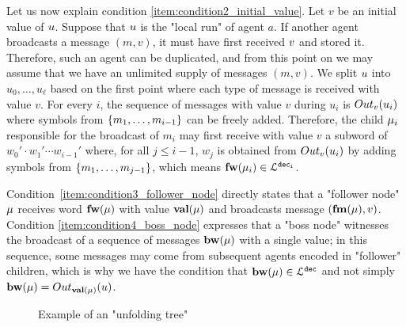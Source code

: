 Let us now explain condition \ref{item:condition2_initial_value}. Let $v$ be an initial value of $u$. Suppose that $u$ is the "local run" of agent $a$. If another agent broadcasts a message $(m,v)$, it must have first received $v$ and stored it. Therefore, such an agent can be duplicated, and from this point on we may assume that we have an unlimited supply of messages $(m,v)$.
We split $u$ into $u_0,\dots,u_\ell$ based on the first point where each type of message is received with value $v$. For every $i$, the sequence of messages with value $v$ during $u_i$ is $\voutput{v}{u_i}$ where symbols from $\{m_1,\dots, m_{i-1}\}$ can be freely added. Therefore, the child $\mu_i$ responsible for the broadcast of $m_i$ may first receive with value $v$ a subword of $w_0' \cdot w_1' \cdots w_{i-1}'$ where, for all $j \leq i-1$, $w_j$ is obtained from $\voutput{v}{u_i}$ by adding symbols from $\{m_1, \dots, m_{j-1}\}$, which means $\mathbf{fw}(\mu_i) \in \mathcal{L}^{\mathtt{\mathtt{dec}_i}}$.   

Condition~\ref{item:condition3_follower_node} directly states that a "follower node" $\mu$ receives word $\mathbf{fw}(\mu)$ with value $\mathbf{val}(\mu)$ and broadcasts message $(\mathbf{fm}(\mu), v)$. Condition \ref{item:condition4_boss_node} expresses that a "boss node" witnesses the broadcast of a sequence of messages $\mathbf{bw}(\mu)$ with a single value; in this sequence, some messages may come from subsequent agents encoded in "follower" children, which is why we have the condition that $\mathbf{bw}(\mu) \in \mathcal{L}^{\mathtt{\mathtt{dec}}}$ and not simply $\bosslabel{\node} = \voutput{\valuelabel{\node}}{\localrun}$. 




\begin{figure}
	\begin{center}
	\resizebox{\textwidth}{!}{
		
	}
	\end{center}
	\caption{Example of an "unfolding tree"}\label{fig-ex-unfolding-tree}
\end{figure}

